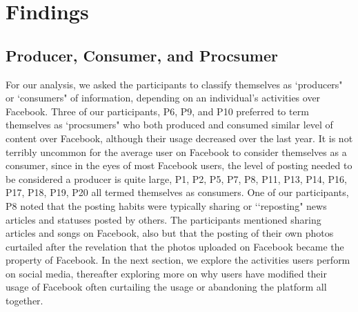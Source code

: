\section{Findings}
\label{sec:findings}

\subsection{Producer, Consumer, and Procsumer}
For our analysis, we asked the participants to classify themselves as \lq producers" or \lq consumers" of information, depending on an individual's activities over Facebook. Three of our participants, P6, P9, and P10 preferred to term themselves as \lq procsumers" who both produced and consumed similar level of content over Facebook, although their usage decreased over the last year. It is not terribly uncommon for the average user on Facebook to consider themselves as a consumer, since in the eyes of most Facebook users, the level of posting needed to be considered a producer is quite large, P1, P2, P5, P7, P8, P11, P13, P14, P16, P17, P18, P19, P20 all termed themselves as consumers. One of our participants, P8 noted that the posting habits were typically sharing or \lq \lq reposting" news articles and statuses posted by others. The participants mentioned sharing articles and songs on Facebook, also but that the posting of their own photos curtailed after the revelation that the photos uploaded on Facebook became the property of Facebook. In the next section, we explore the activities users perform on social media, thereafter exploring more on why users have modified their usage of Facebook often curtailing the usage or abandoning the platform all together.

